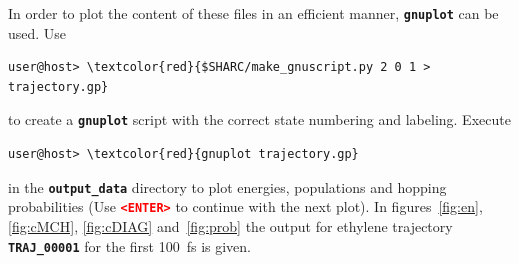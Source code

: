 \documentclass[a4paper,11pt,DIV=15,openany]{scrbook}
\newcommand{\ttt}[1]{\textbf{\texttt{#1}}}
\begin{document}
In order to plot the content of these files in an efficient manner, \ttt{gnuplot} can be used. Use
\begin{Verbatim}[commandchars=\\\{\}]
user@host> \textcolor{red}{$SHARC/make_gnuscript.py 2 0 1 > trajectory.gp}
\end{Verbatim}
to create a \ttt{gnuplot} script with the correct state numbering and labeling. Execute
\begin{Verbatim}[commandchars=\\\{\}]
user@host> \textcolor{red}{gnuplot trajectory.gp}
\end{Verbatim}
in the \ttt{output\_data} directory to plot energies, populations and hopping probabilities (Use \textcolor{red}{\ttt{<ENTER>}} to continue with the next plot). In figures~\ref{fig:en}, \ref{fig:cMCH}, \ref{fig:cDIAG} and~\ref{fig:prob} the output for ethylene trajectory \ttt{TRAJ\_00001} for the first 100~fs is given.
\end{document}
